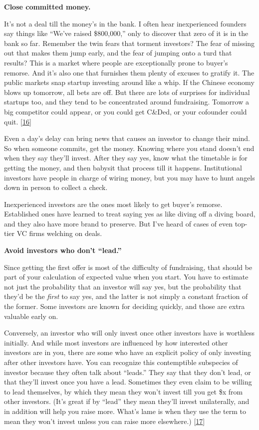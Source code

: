 \textbf{Close committed money.}

It's not a deal till the money's in the bank. I often hear inexperienced
founders say things like ``We've raised \$800,000,'' only to discover
that zero of it is in the bank so far. Remember the twin fears that
torment investors? The fear of missing out that makes them jump early,
and the fear of jumping onto a turd that results? This is a market where
people are exceptionally prone to buyer's remorse. And it's also one
that furnishes them plenty of excuses to gratify it. The public markets
snap startup investing around like a whip. If the Chinese economy blows
up tomorrow, all bets are off. But there are lots of surprises for
individual startups too, and they tend to be concentrated around
fundraising. Tomorrow a big competitor could appear, or you could get
C\&Ded, or your cofounder could quit. {[}\hyperref[f16n]{16}{]}

Even a day's delay can bring news that causes an investor to change
their mind. So when someone commits, get the money. Knowing where you
stand doesn't end when they say they'll invest. After they say yes, know
what the timetable is for getting the money, and then babysit that
process till it happens. Institutional investors have people in charge
of wiring money, but you may have to hunt angels down in person to
collect a check.

Inexperienced investors are the ones most likely to get buyer's remorse.
Established ones have learned to treat saying yes as like diving off a
diving board, and they also have more brand to preserve. But I've heard
of cases of even top-tier VC firms welching on deals.

\textbf{Avoid investors who don't ``lead.''}

Since getting the first offer is most of the difficulty of fundraising,
that should be part of your calculation of expected value when you
start. You have to estimate not just the probability that an investor
will say yes, but the probability that they'd be the \emph{first} to say
yes, and the latter is not simply a constant fraction of the former.
Some investors are known for deciding quickly, and those are extra
valuable early on.

Conversely, an investor who will only invest once other investors have
is worthless initially. And while most investors are influenced by how
interested other investors are in you, there are some who have an
explicit policy of only investing after other investors have. You can
recognize this contemptible subspecies of investor because they often
talk about ``leads.'' They say that they don't lead, or that they'll
invest once you have a lead. Sometimes they even claim to be willing to
lead themselves, by which they mean they won't invest till you get \$x
from other investors. (It's great if by ``lead'' they mean they'll
invest unilaterally, and in addition will help you raise more. What's
lame is when they use the term to mean they won't invest unless you can
raise more elsewhere.) {[}\hyperref[f17n]{17}{]}

